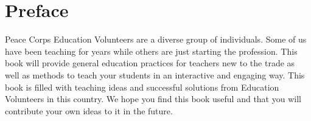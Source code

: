 \chapter*{Preface}
Peace Corps Education Volunteers are a diverse group of individuals. Some of us have been teaching for years while others are just starting the profession. This book will provide general education practices for teachers new to the trade as well as methods to teach your students in an interactive and engaging way. This book is filled with teaching ideas and successful solutions from Education Volunteers in this country. We hope you find this book useful and that you will contribute your own ideas to it in the future.